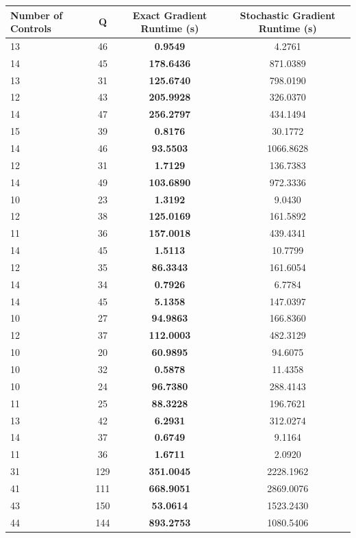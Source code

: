 \documentclass{article}
\begin{document}
\begin{table}[h]
\centering
\begin{tabular}{lccc}
\toprule
Number of Controls & Q & Exact Gradient Runtime (s) & Stochastic Gradient Runtime (s) \\
\midrule
13 & 46 & \textbf{0.9549} & 4.2761 \\
14 & 45 & \textbf{178.6436} & 871.0389 \\
13 & 31 & \textbf{125.6740} & 798.0190 \\
12 & 43 & \textbf{205.9928} & 326.0370 \\
14 & 47 & \textbf{256.2797} & 434.1494 \\
15 & 39 & \textbf{0.8176} & 30.1772 \\
14 & 46 & \textbf{93.5503} & 1066.8628 \\
12 & 31 & \textbf{1.7129} & 136.7383 \\
14 & 49 & \textbf{103.6890} & 972.3336 \\
10 & 23 & \textbf{1.3192} & 9.0430 \\
12 & 38 & \textbf{125.0169} & 161.5892 \\
11 & 36 & \textbf{157.0018} & 439.4341 \\
14 & 45 & \textbf{1.5113} & 10.7799 \\
12 & 35 & \textbf{86.3343} & 161.6054 \\
14 & 34 & \textbf{0.7926} & 6.7784 \\
14 & 45 & \textbf{5.1358} & 147.0397 \\
10 & 27 & \textbf{94.9863} & 166.8360 \\
12 & 37 & \textbf{112.0003} & 482.3129 \\
10 & 20 & \textbf{60.9895} & 94.6075 \\
10 & 32 & \textbf{0.5878} & 11.4358 \\
10 & 24 & \textbf{96.7380} & 288.4143 \\
11 & 25 & \textbf{88.3228} & 196.7621 \\
13 & 42 & \textbf{6.2931} & 312.0274 \\
14 & 37 & \textbf{0.6749} & 9.1164 \\
11 & 36 & \textbf{1.6711} & 2.0920 \\
31 & 129 & \textbf{351.0045} & 2228.1962 \\
41 & 111 & \textbf{668.9051} & 2869.0076 \\
43 & 150 & \textbf{53.0614} & 1523.2430 \\
44 & 144 & \textbf{893.2753} & 1080.5406 \\

\end{tabular}
\end{table}
\end{document}
